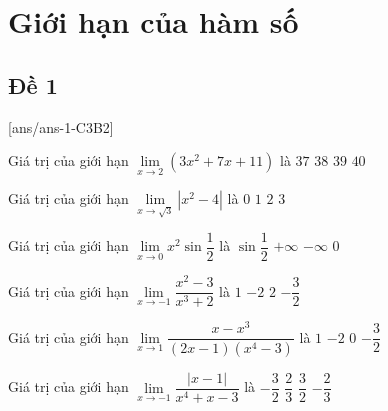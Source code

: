 \section{Giới hạn của hàm số}

\subsection{Đề 1}
[ans/ans-1-C3B2]
\caulc
\begin{ex}%
	Giá trị của giới hạn $\lim\limits_{x\to 2}(3x^2+7x+11)$ là
	\choice
	{\True $37$}
	{$38$}
	{$39$}
	{$40$}
\end{ex}

\begin{ex}%
	Giá trị của giới hạn $\lim\limits_{x\to\sqrt 3}|x^2-4|$ là
	\choice
	{$0$}
	{\True $1$}
	{$2$}
	{$3$}
\end{ex}

\begin{ex}%
	Giá trị của giới hạn $\lim\limits_{x\to 0}{x^2}\sin\dfrac{1}{2}$ là
	\choice
	{$\sin\dfrac{1}{2}$}
	{$+\infty$}
	{$-\infty$}
	{\True $0$}
\end{ex}

\begin{ex}%
	Giá trị của giới hạn $\lim\limits_{x\to -1}\dfrac{x^2-3}{x^3+2}$ là
	\choice
	{$1$}
	{\True $-2$}
	{$2$}
	{$-\dfrac{3}{2}$}
\end{ex}

\begin{ex}%
	Giá trị của giới hạn $\lim\limits_{x\to 1}\dfrac{x-x^3}{(2x-1)(x^4-3)}$ là
	\choice
	{$1$}
	{$-2$}
	{\True $0$}
	{$-\dfrac{3}{2}$}
\end{ex}

\begin{ex}%
	Giá trị của giới hạn $\lim\limits_{x\to -1}\dfrac{|x-1|}{x^4+x-3}$ là
	\choice
	{$-\dfrac{3}{2}$}
	{$\dfrac{2}{3}$}
	{$\dfrac{3}{2}$}
	{\True $-\dfrac{2}{3}$}
\end{ex}


